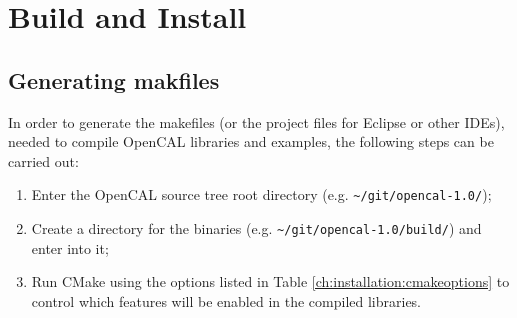 


\section{Build and Install}

\subsection{Generating makfiles}

In order to generate the makefiles (or the project files for Eclipse
or other IDEs), needed to compile OpenCAL libraries and examples, the
following steps can be carried out:

\begin{enumerate}
\item Enter the OpenCAL source tree root directory (e.g. \verb'~/git/opencal-1.0/');
\item Create a directory for the binaries
  (e.g. \verb'~/git/opencal-1.0/build/') and enter into it;
\item Run CMake using the options listed in Table
  \ref{ch:installation:cmakeoptions} to control which features will be
  enabled in the compiled libraries.
\end{enumerate}

